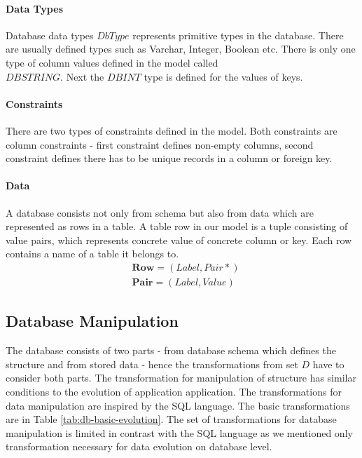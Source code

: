 \documentclass[runningheads]{comsis}
\begin{document}
\paragraph{Data Types} Database data types $DbType$ represents primitive types in the database. There are usually defined types such as Varchar, Integer, Boolean etc. There is only one type of column values defined in the model called \\ $DBSTRING$. Next the $DBINT$ type is defined for the values of keys.

\paragraph{Constraints} There are two types of constraints defined in the model. Both constraints are column constraints - first constraint defines non-empty columns, second constraint defines there has to be unique records in a column or foreign key.

\paragraph{Data} A database consists not only from schema but also from data which are represented as rows in a table. A table row in our model is a tuple consisting of value pairs, which represents concrete value of concrete column or key. Each row contains a name of a table it belongs to.
\begin{align}
&	\mathbf{Row} = (Label, Pair*) \\
&	\mathbf{Pair} = (Label, Value) 
\end{align}


\subsection{Database Manipulation}
\label{sec:db-evolution}
The database consists of two parts - from database schema which defines the structure and from stored data - hence the transformations from set $D$ have to consider both parts. The transformation for manipulation of structure has similar conditions to the evolution of application application. The transformations for data manipulation are inspired by the SQL language. The basic transformations are in Table \ref{tab:db-basic-evolution}. The set of transformations for database manipulation is limited in contrast with the SQL language as we mentioned only transformation necessary for data evolution on database level. 
\end{document}
